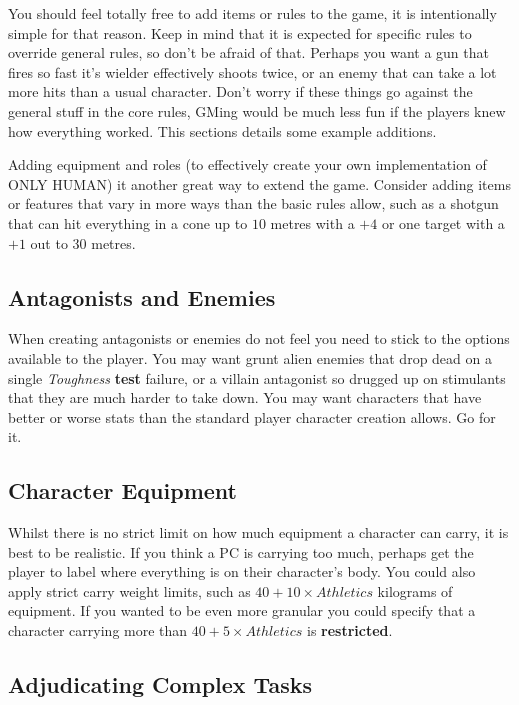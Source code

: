 \documentclass[11pt]{article}
\begin{document}
\begin{multicols}{3}
  You should feel totally free to add items or rules to the game, it is intentionally simple for that reason. Keep in mind that it is expected for specific rules to override general rules, so don't be afraid of that. Perhaps you want a gun that fires so fast it's wielder effectively shoots twice, or an enemy that can take a lot more hits than a usual character. Don't worry if these things go against the general stuff in the core rules, GMing would be much less fun if the players knew how everything worked. This sections details some example additions.

  Adding equipment and roles (to effectively create your own implementation of ONLY HUMAN) it another great way to extend the game. Consider adding items or features that vary in more ways than the basic rules allow, such as a shotgun that can hit everything in a cone up to $10$ metres with a $+4$ or one target with a $+1$ out to $30$ metres.

  \subsection*{Antagonists and Enemies}

  When creating antagonists or enemies do not feel you need to stick to the options available to the player. You may want grunt alien enemies that drop dead on a single \textit{Toughness} \textbf{test} failure, or a villain antagonist so drugged up on stimulants that they are much harder to take down. You may want characters that have better or worse stats than the standard player character creation allows. Go for it.

  \subsection*{Character Equipment}

  Whilst there is no strict limit on how much equipment a character can carry, it is best to be realistic. If you think a PC is carrying too much, perhaps get the player to label where everything is on their character's body. You could also apply strict carry weight limits, such as $40 + 10 \times Athletics$ kilograms of equipment. If you wanted to be even more granular you could specify that a character carrying more than $40 + 5 \times Athletics$ is \textbf{restricted}.

  \subsection*{Adjudicating Complex Tasks}


\end{multicols}
\end{document}

